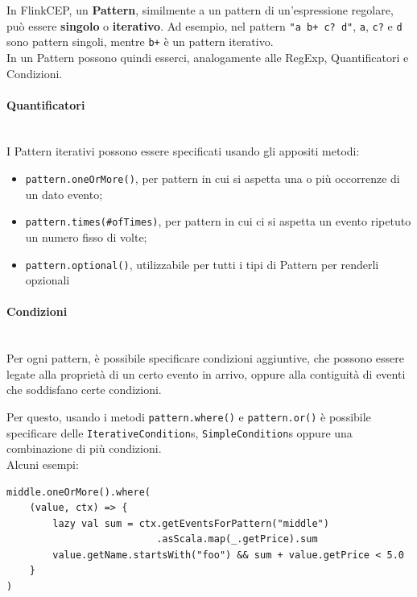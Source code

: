 In FlinkCEP, un \textbf{Pattern}, similmente a un pattern di un'espressione regolare, può essere \textbf{singolo} o \textbf{iterativo}. Ad esempio, nel pattern \verb|"a b+ c? d"|, \verb|a|, \verb|c?| e \verb|d| sono pattern singoli, mentre \verb|b+| è un pattern iterativo.
\\
In un Pattern possono quindi esserci, analogamente alle RegExp, Quantificatori e Condizioni.

\paragraph{Quantificatori} ~\\

I Pattern iterativi possono essere specificati usando gli appositi metodi:

\begin{itemize}
    \item \verb|pattern.oneOrMore()|, per pattern in cui si aspetta una o più occorrenze di un dato evento;
    \item \verb|pattern.times(#ofTimes)|, per pattern in cui ci si aspetta un evento ripetuto un numero fisso di volte;
    \item \verb|pattern.optional()|, utilizzabile per tutti i tipi di Pattern per renderli opzionali
\end{itemize}

\paragraph{Condizioni} ~\\

Per ogni pattern, è possibile specificare condizioni aggiuntive, che possono essere legate alla proprietà di un certo evento in arrivo, oppure alla contiguità di eventi che soddisfano certe condizioni.

Per questo, usando i metodi \verb|pattern.where()| e \verb|pattern.or()| è possibile specificare delle \verb|IterativeCondition|s, \verb|SimpleCondition|s oppure una combinazione di più condizioni.
\\
Alcuni esempi:

\begin{code}
\label{code:iterative-cond}
\begin{verbatim}
middle.oneOrMore().where(
    (value, ctx) => {
        lazy val sum = ctx.getEventsForPattern("middle")
                          .asScala.map(_.getPrice).sum
        value.getName.startsWith("foo") && sum + value.getPrice < 5.0
    }
)
\end{verbatim}
\end{code}~\\

